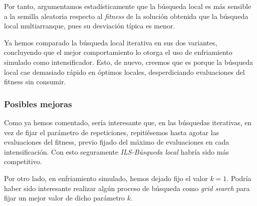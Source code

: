 \documentclass[11pt]{article}
\begin{document}
Por tanto, argumentamos estadísticamente que la búsqueda local es más sensible a la semilla aleatoria respecto al \emph{fitness} de la solución obtenida que la búsqueda local multiarranque, pues su desviación típica es menor.

Ya hemos comparado la búsqueda local iterativa en sus dos variantes, concluyendo que el mejor comportamiento lo otorga el uso de enfriamiento simulado como intensificador. Esto, de nuevo, creemos que es porque la búsqueda local cae demasiado rápido en óptimos locales, desperdiciando evaluaciones del fitness sin consumir.

\subsubsection{Posibles mejoras}

Como ya hemos comentado, sería interesante que, en las búsquedas iterativas, en vez de fijar el parámetro de repeticiones, repitiésemos hasta agotar las evaluaciones del fitness, previo fijado del máximo de evaluaciones en cada intensificación. Con esto seguramente \emph{ILS-Búsqueda local} habría sido más competitivo.

Por otro lado, en enfriamiento simulado, hemos dejado fijo el valor $k = 1$. Podría haber sido interesante realizar algún proceso de búsqueda como \emph{grid search} para fijar un mejor valor de dicho parámetro $k$.

\pagebreak



\end{document}
